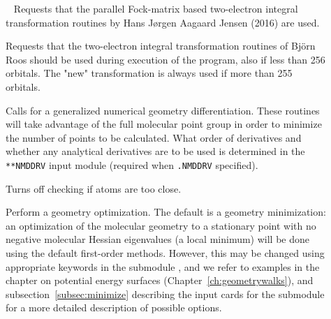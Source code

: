 \begin{description}
\item[]\verb| |\newline
{} Requests that the parallel
Fock-matrix based two-electron integral transformation routines
by Hans J\o rgen Aagaard Jensen (2016) are used.

\item[] Requests that the
two-electron integral transformation routines of Bj\"{o}rn Roos
should be used during execution of the program, also if less than
256 orbitals. The "new" transformation is always used if more than 255 orbitals.

\item[] Calls for a generalized numerical geometry
differentiation. These routines will take advantage of the full
molecular point group in order to minimize the number of points to be
calculated. What order of derivatives and whether any analytical
derivatives are to be used is determined in the \verb|**NMDDRV| input
module (required when \texttt{.NMDDRV} specified).

\item[] Turns off checking if atoms are too close.

\item[] Perform a geometry optimization.
The default is a geometry minimization:
an optimization of the molecular geometry to a stationary point with no
negative molecular Hessian eigenvalues
(a local minimum) will be done using the default first-order
methods. However, this may be changed using appropriate
keywords in the submodule , and we refer to examples in
the chapter on potential energy surfaces
(Chapter~\ref{ch:geometrywalks}), and subsection~\ref{subsec:minimize}
describing the input cards for the  submodule for a more
detailed description of possible options.



\end{description}
